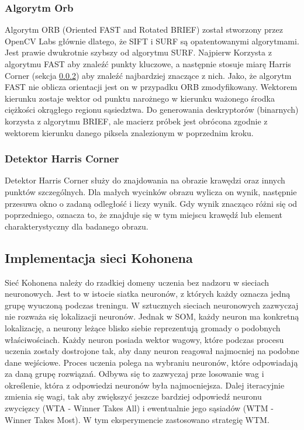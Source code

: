 \documentclass[12pt, notitlepage]{article}
\begin{document}
\subsubsection{Algorytm Orb}

Algorytm ORB (Oriented FAST and Rotated BRIEF) został stworzony przez OpenCV Labs głównie dlatego, że SIFT i SURF są opatentowanymi algorytmami. Jest prawie dwukrotnie szybszy od algorytmu SURF. Najpierw Korzysta z algorytmu FAST\cite{fast} aby znaleźć punkty kluczowe, a następnie stosuje miarę Harris Corner (sekcja \ref{sec:harris}) aby znaleźć najbardziej znaczące z nich. Jako, że algorytm FAST nie oblicza orientacji jest on w przypadku ORB zmodyfikowany. Wektorem kierunku zostaje wektor od punktu narożnego w kierunku ważonego środka ciężkości okrągłego regionu sąsiedztwa. Do generowania deskryptorów (binarnych) korzysta z algorytmu BRIEF\cite{brief}, ale macierz próbek jest obrócona zgodnie z wektorem kierunku danego piksela znalezionym w poprzednim kroku.

\subsubsection{Detektor Harris Corner} \label{sec:harris}

Detektor Harris Corner\cite{harris_corner} służy do znajdowania na obrazie krawędzi oraz innych punktów szczególnych. Dla małych wycinków obrazu wylicza on wynik, następnie przesuwa okno o zadaną odległość i liczy wynik. Gdy wynik znacząco różni się od poprzedniego, oznacza to, że znajduje się w tym miejscu krawędź lub element charakterystyczny dla badanego obrazu.

\subsection{Implementacja sieci Kohonena}

Sieć Kohonena należy do rzadkiej domeny uczenia bez nadzoru w sieciach neuronowych. Jest to w istocie siatka neuronów, z których każdy oznacza jedną grupę wyuczoną podczas treningu. W sztucznych sieciach neuronowych zazwyczaj nie rozważa się lokalizacji neuronów. Jednak w SOM, każdy neuron ma konkretną lokalizację, a neurony leżące blisko siebie reprezentują gromady o podobnych właściwościach. Każdy neuron posiada wektor wagowy, które podczas procesu uczenia zostały dostrojone tak, aby dany neuron reagował najmocniej na podobne dane wejściowe. Proces uczenia polega na wybraniu neuronów, które odpowiadają za daną grupę rozwiązań. Odbywa się to zazwyczaj prze losowanie wag i określenie, która z odpowiedzi neuronów była najmocniejsza. Dalej iteracyjnie zmienia się wagi, tak aby zwiększyć jeszcze bardziej odpowiedź neuronu zwycięzcy (WTA - Winner Takes All) i ewentualnie jego sąsiadów (WTM - Winner Takes Most). W tym eksperymencie zastosowano strategię WTM.
\end{document}
